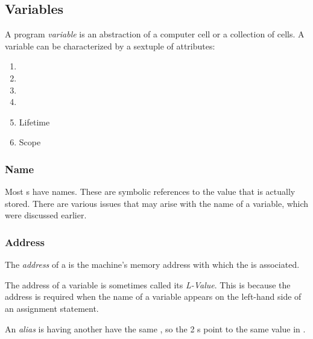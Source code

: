 \subsection{Variables}\label{subsec:Variables}
\begin{definition}[Variable]\label{def:Variable}
  A program \emph{variable} is an abstraction of a computer  cell or a collection of  cells.
  A variable can be characterized by a sextuple of attributes:
  \begin{enumerate}[noitemsep]
  \item {}
  \item {}
  \item {}
  \item {}
  \item Lifetime
  \item Scope
  \end{enumerate}
\end{definition}

\subsubsection{Name}\label{subsubsec:Variable_Name}
Most s have names.
These are symbolic references to the value that is actually stored.
There are various issues that may arise with the name of a variable, which were discussed earlier.

\subsubsection{Address}\label{subsubsec:Variable_Address}
\begin{definition}[Address]\label{def:Variable_Address}
  The \emph{address} of a  is the machine's memory address with which the  is associated.

  The address of a variable is sometimes called its \emph{L-Value}.
  This is because the address is required when the name of a variable appears on the left-hand side of an assignment statement.

  \begin{remark}[Alias]
    An \emph{alias} is having another  have the same , so the 2 s point to the same value in .
  \end{remark}
\end{definition}

